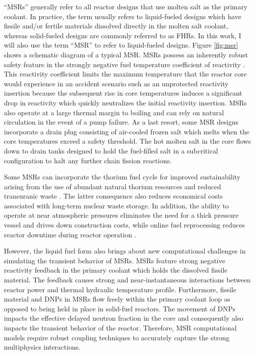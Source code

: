 ``\glspl{MSR}'' generally refer to all reactor designs that use molten salt as
the primary coolant. In practice, the term usually refers to liquid-fueled
designs which have fissile and/or fertile materials dissolved directly in the
molten salt coolant, whereas solid-fueled designs are commonly referred to as
\glspl{FHR}. In this work, I will also use the term ``\gls{MSR}'' to refer to
liquid-fueled designs. Figure \ref{fig:msr} shows a schematic diagram of a
typical \gls{MSR}. \glspl{MSR} possess an inherently robust
safety feature in the strongly negative fuel temperature coefficient of
reactivity \cite{elsheikh_safety_2013}. This reactivity coefficient limits the
maximum temperature that the reactor core would experience in an accident
scenario such as an unprotected reactivity insertion because the subsequent
rise in core temperatures induces a significant drop in reactivity which
quickly neutralizes the initial reactivity insertion. \glspl{MSR} also
operate at a large thermal margin to boiling and can rely on natural
circulation in the event of a pump failure. As a last resort, some \gls{MSR}
designs incorporate a drain plug consisting of air-cooled frozen salt which
melts when the core temperatures exceed a safety threshold. The hot molten salt
in the core flows down to drain tanks designed to hold the fuel-filled salt in
a subcritical configuration to halt any further chain fission reactions.

Some \glspl{MSR} can
incorporate the thorium fuel cycle for improved sustainability arising from the
use of abundant natural thorium resources and reduced transuranic waste
\cite{heuer_towards_2014}. The latter consequence also reduces economical costs
associated with long-term nuclear waste storage. In addition, the ability to
operate at near atmospheric pressures eliminates the need for a thick pressure
vessel and drives down construction costs, while online fuel reprocessing
reduces reactor downtime during reactor operation \cite{dolan_1_2017}.

However, the liquid fuel form also brings about new computational
challenges in simulating the transient behavior of \glspl{MSR}. \glspl{MSR}
feature strong negative reactivity feedback in the primary coolant which holds
the dissolved fissile material. The feedback causes strong and
near-instantaneous interactions between reactor power and thermal hydraulic
temperature profile. Furthermore, fissile material
and \glspl{DNP} in \glspl{MSR} flow freely within the primary coolant
loop as opposed to being held in place in solid-fuel reactors. The movement of
\glspl{DNP} impacts the effective delayed neutron fraction in the core and
consequently also impacts the transient behavior of the reactor. Therefore,
\gls{MSR} computational models require robust coupling techniques to accurately
capture the strong multiphysics interactions.

